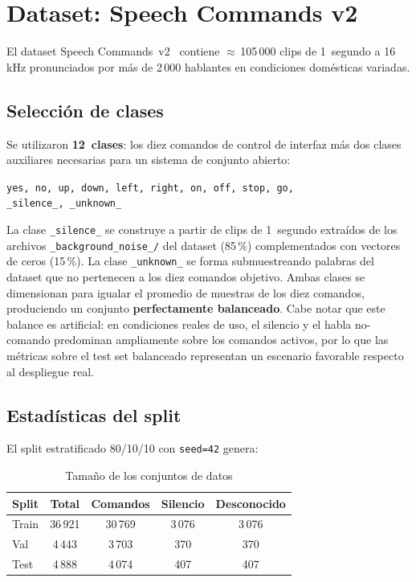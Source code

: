 \documentclass[conference]{IEEEtran}
\begin{document}
\section{Dataset: Speech Commands v2}

El dataset Speech Commands~v2~\cite{warden2018speech} contiene
$\approx$\,105\,000 clips de 1~segundo a 16\,kHz pronunciados por más de
2\,000 hablantes en condiciones domésticas variadas.

\subsection{Selección de clases}

Se utilizaron \textbf{12~clases}: los diez comandos de control de interfaz más
dos clases auxiliares necesarias para un sistema de conjunto abierto:

\begin{center}
\texttt{yes, no, up, down, left, right, on, off, stop, go,}\\
\texttt{\_silence\_, \_unknown\_}
\end{center}

La clase \texttt{\_silence\_} se construye a partir de clips de 1~segundo
extraídos de los archivos \texttt{\_background\_noise\_/} del dataset
(85\,\%) complementados con vectores de ceros (15\,\%).  La clase
\texttt{\_unknown\_} se forma submuestreando palabras del dataset que no
pertenecen a los diez comandos objetivo.  Ambas clases se dimensionan para
igualar el promedio de muestras de los diez comandos, produciendo un conjunto
\textbf{perfectamente balanceado}.  Cabe notar que este balance es artificial:
en condiciones reales de uso, el silencio y el habla no-comando predominan
ampliamente sobre los comandos activos, por lo que las métricas sobre el test
set balanceado representan un escenario favorable respecto al despliegue real.

\subsection{Estadísticas del split}

El split estratificado 80/10/10 con \texttt{seed=42} genera:

\begin{table}[htbp]
\caption{Tamaño de los conjuntos de datos}
\label{tab:split}
\centering
\begin{tabular}{lcccc}
\toprule
\textbf{Split} & \textbf{Total} & \textbf{Comandos} & \textbf{Silencio} & \textbf{Desconocido} \\
\midrule
Train   & 36\,921 & 30\,769 & 3\,076 & 3\,076 \\
Val     &  4\,443 &  3\,703 &   370  &   370  \\
Test    &  4\,888 &  4\,074 &   407  &   407  \\
\bottomrule
\end{tabular}
\end{table}
\end{document}
